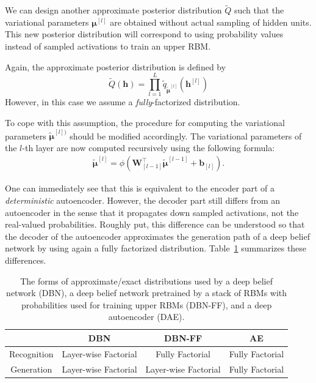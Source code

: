 \documentclass[dissertation,nocontribution,draft*]{aaltoseries}
\newcommand{\qlay}[1]{\left[#1\right]}
\newcommand{\vect}[1]{\mathbf{#1}}
\newcommand{\vects}[1]{\boldsymbol{#1}}
\newcommand{\matr}[1]{\mathbf{#1}}
\newcommand{\vb}[0]{\vect{b}}
\newcommand{\vh}[0]{\vect{h}}
\newcommand{\mW}[0]{\matr{W}}
\newcommand{\vmu}[0]{\vects{\mu}}
\begin{document}
We can design another approximate posterior distribution
$\tilde{Q}$ such that the variational parameters
$\vmu^{\qlay{l}}$ are obtained without actual sampling of hidden
units. This new posterior distribution will correspond to
using probability values instead of sampled activations to
train an upper RBM.

Again, the approximate posterior distribution is defined by
\[
\tilde{Q}(\vh) = \prod_{l=1}^L \tilde{q}_{\tilde{\vmu}^{\qlay{l}}}\left(
\vh^{\qlay{l}} \right)
\]
However, in this case we assume a \textit{fully}-factorized
distribution. 

To cope with this assumption, the procedure for computing
the variational parameters $\tilde{\vmu}^{\qlay{l})}$ should
be modified accordingly.  The variational parameters of the
$l$-th layer are now computed recursively using the
following formula: 
\begin{align}
    \label{eq:dbn_posterior_ff}
    \tilde{\vmu}^{\qlay{l}} = \phi\left( \mW_{\qlay{l-1}}^\top
    \tilde{\vmu}^{\qlay{l-1}} + \vb_{\qlay{l}} \right).
\end{align}

One can immediately see that this is equivalent to the
encoder part of a \textit{deterministic} autoencoder.
However, the decoder part still differs from an autoencoder
in the sense that it propagates down sampled activations,
not the real-valued probabilities.  Roughly put, this
difference can be understood so that the decoder of the
autoencoder approximates the generation path of a deep
belief network by using again a fully factorized distribution.
Table~\ref{tbl:dbn_ae} summarizes these differences.

\begin{table}[h]
\vskip 0.15in
    \centering
    \begin{tabular}{c || c | c | c}
        & DBN & DBN-FF & AE \\
        \hline
        \hline
        Recognition & Layer-wise Factorial & Fully Factorial & Fully Factorial \\
        \hline
        Generation & Layer-wise Factorial & Layer-wise Factorial & Fully Factorial \\
    \end{tabular}
    \caption{The forms of approximate/exact 
    distributions used by a deep belief network (DBN), a
    deep belief network pretrained by a stack of RBMs with
    probabilities used for training upper RBMs (DBN-FF), and
    a deep autoencoder (DAE).}
    \label{tbl:dbn_ae}
\end{table}
\end{document}
